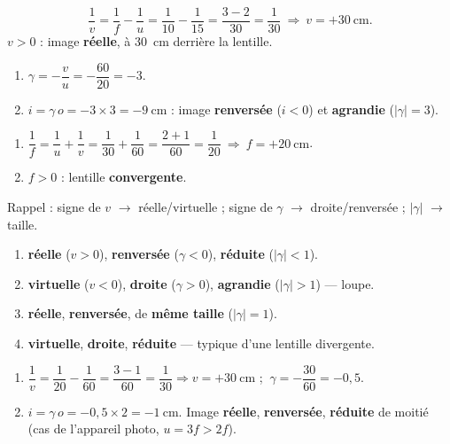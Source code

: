 \documentclass[11pt,a4paper]{article}
\begin{document}

\begin{corrige}
\[ \frac{1}{v}=\frac{1}{f}-\frac{1}{u}=\frac{1}{10}-\frac{1}{15}=\frac{3-2}{30}=\frac{1}{30}
   \ \Rightarrow\ v=+\qty{30}{\cm}. \]
$v>0$ : image \textbf{réelle}, à \qty{30}{\cm} derrière la lentille.
\end{corrige}

\begin{corrige}
\begin{enumerate}[label=\alph*)]
  \item $\gamma=-\dfrac{v}{u}=-\dfrac{60}{20}=-3$.
  \item $i=\gamma\,o=-3\times 3=\qty{-9}{\cm}$ : image \textbf{renversée} ($i<0$) et \textbf{agrandie}
        ($|\gamma|=3$).
\end{enumerate}
\end{corrige}

\begin{corrige}
\begin{enumerate}[label=\alph*)]
  \item $\dfrac{1}{f}=\dfrac{1}{u}+\dfrac{1}{v}=\dfrac{1}{30}+\dfrac{1}{60}=\dfrac{2+1}{60}=\dfrac{1}{20}
        \ \Rightarrow\ f=+\qty{20}{\cm}$.
  \item $f>0$ : lentille \textbf{convergente}.
\end{enumerate}
\end{corrige}

\begin{corrige}
Rappel : signe de $v$ $\to$ réelle/virtuelle ; signe de $\gamma$ $\to$ droite/renversée ;
$|\gamma|$ $\to$ taille.
\begin{enumerate}[label=\alph*)]
  \item \textbf{réelle} ($v>0$), \textbf{renversée} ($\gamma<0$), \textbf{réduite} ($|\gamma|<1$).
  \item \textbf{virtuelle} ($v<0$), \textbf{droite} ($\gamma>0$), \textbf{agrandie} ($|\gamma|>1$) --- loupe.
  \item \textbf{réelle}, \textbf{renversée}, de \textbf{même taille} ($|\gamma|=1$).
  \item \textbf{virtuelle}, \textbf{droite}, \textbf{réduite} --- typique d'une lentille divergente.
\end{enumerate}
\end{corrige}

\begin{corrige}
\begin{enumerate}[label=\alph*)]
  \item $\dfrac{1}{v}=\dfrac{1}{20}-\dfrac{1}{60}=\dfrac{3-1}{60}=\dfrac{1}{30}\Rightarrow v=+\qty{30}{\cm}$ ;
        $\ \gamma=-\dfrac{30}{60}=-0{,}5$.
  \item $i=\gamma\,o=-0{,}5\times 2=\qty{-1}{\cm}$. Image \textbf{réelle}, \textbf{renversée},
        \textbf{réduite} de moitié (cas de l'appareil photo, $u=3f>2f$).
\end{enumerate}
\end{corrige}
\end{document}
